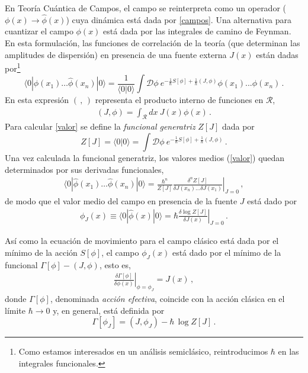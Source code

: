 En Teoría Cuántica de Campos, el campo se reinterpreta como un operador ($\phi(x) \rightarrow \hat{\phi}(x)$) cuya dinámica está dada por \eqref{campos}. Una alternativa para cuantizar el campo $\phi(x)$ está dada por las integrales de camino de Feynman. En esta formulación, las funciones de correlación de la teoría (que determinan las amplitudes de dispersión) en presencia de una fuente externa $J(x)$ están dadas por\footnote{ Como estamos interesados en un análisis semiclásico, reintroducimos $\hbar$ en las integrales funcionales.}
\begin{equation}
\langle 0 | \hat{ \phi  } (x _1) \ldots \hat{\phi  } (x _n) | 0 \rangle = \frac{1}{\langle 0|0\rangle} 
\int  \mathscr D
\phi \ e ^{- \frac{1}{\hbar} S[ \phi ] + \frac{1}{\hbar} (J, \phi )} \phi (x _1) ... \phi (x _n)\,.
\label{valor}
\end{equation}
En esta expresión $(\,,\,) $ representa el producto interno de funciones en $\mathcal R$,
\begin{align}
	(J,\phi) = \int_\mathcal R dx\ J(x) \phi (x)\,.
\end{align}
Para calcular \eqref{valor} se define la {\it funcional generatriz} $Z[J]$ dada por
\begin{equation}
Z [J] = \langle0|0\rangle=
\int \mathscr D \phi \ e ^{- \frac{1}{ \hbar} S[ \phi ] + \frac{1}{\hbar} (J, \phi )}\,.
\label{eq.generatriz}
\end{equation}
Una vez calculada la funcional generatriz, los valores medios (\ref{valor}) quedan determinados por sus derivadas funcionales,
\begin{equation}
\begin{array}{c}
\langle 0 | \hat{ \phi  } (x _1) \ldots \hat{\phi  } (x _n) | 0 \rangle = \frac{\hbar ^n}{Z[J]}
\left. \frac{\delta ^n  Z[J] }{ \delta J(x_n) \ldots \delta J(x _1) } 		\right| _{J=0}\,,
\end{array}
\end{equation}
de modo que el valor medio del campo en presencia de la fuente $J$ está dado por
\begin{equation}
\begin{array}{c}
\phi _J (x) \equiv \langle 0| \hat{\phi } (x)| 0 \rangle = \hbar \left. \frac{\delta \log Z[J] }{\delta J(x)} \right| _{J=0} \,.
\end{array}
\end{equation}

Así como la ecuación de movimiento para el campo clásico está dada por el mínimo de la acción $S[\phi]$, el campo $ \phi _J (x) $ está dado por el mínimo de la funcional $\Gamma[\phi]-(J,\phi)$, esto es,
\begin{equation}
\begin{array}{c}
\left.\frac{\delta \Gamma [ \phi ]  }{\delta \phi (x)  }\right|_{\phi=\phi_J} = 
J (x)\,,
\end{array}
\label{eq.accion1}
\end{equation}
donde $\Gamma[\phi]$, denominada {\it acción efectiva}, coincide con la acción clásica en el límite $\hbar\to 0$ y, en general, está definida por
\begin{equation}
\Gamma [\phi _J] = (J, \phi _J) -  \hbar \, \log Z [J]\,.
\label{efectiva}
\end{equation}

